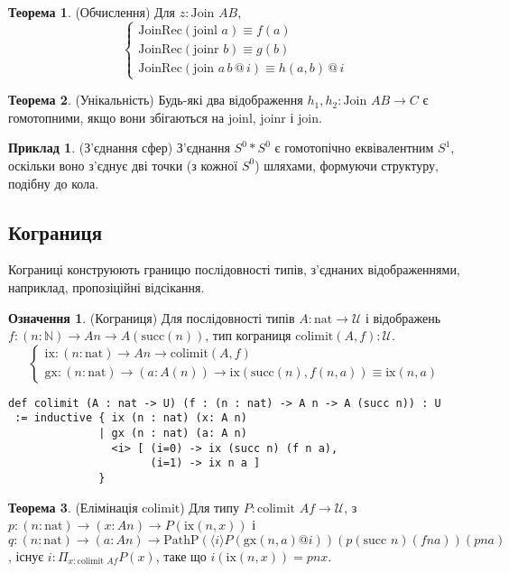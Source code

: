 \documentclass{article}
\theoremstyle{definition}
\newtheorem{theorem}{Теорема}
\newtheorem{definition}{Означення}
\newtheorem{example}{Приклад}
\begin{document}
\begin{theorem} (Обчислення)
Для \( z : \text{Join } A B \),
\[
\begin{cases}
\text{JoinRec}(\text{joinl } a) \equiv f(a) \\
\text{JoinRec}(\text{joinr } b) \equiv g(b) \\
\text{JoinRec}(\text{join } a \, b \, @ \, i) \equiv h(a, b) \, @ \, i
\end{cases}
\]
\end{theorem}

\begin{theorem} (Унікальність)
Будь-які два відображення \( h_1, h_2 : \text{Join } A B \to C \) є гомотопними,
якщо вони збігаються на \( \text{joinl} \), \( \text{joinr} \) і \( \text{join} \).
\end{theorem}

\begin{example} (З’єднання сфер)
З’єднання \( S^0 * S^0 \) є гомотопічно еквівалентним \( S^1 \), оскільки воно з’єднує
дві точки (з кожної \( S^0 \)) шляхами, формуючи структуру, подібну до кола.
\end{example}

\subsection{Кограниця}
Кограниці конструюють границю послідовності типів, з’єднаних відображеннями,
наприклад, пропозіційні відсікання.

\begin{definition} (Кограниця)
Для послідовності типів \( A : \text{nat} \to \mathcal{U} \) і
відображень \( f : (n : \mathbb{N}) \to A n \to A(\text{succ}(n)) \),
тип кограниця \( \text{colimit}(A,f) : \mathcal{U} \).
\[
\begin{cases}
\text{ix} : (n : \text{nat}) \to A n \to \text{colimit}(A,f) \\
\text{gx} : (n : \text{nat}) \to (a : A(n)) \to \text{ix} (\text{succ}(n),f(n,a)) \equiv \text{ix}(n,a)
\end{cases}
\]
\begin{lstlisting}
def colimit (A : nat -> U) (f : (n : nat) -> A n -> A (succ n)) : U
 := inductive { ix (n : nat) (x: A n)
              | gx (n : nat) (a: A n)
                <i> [ (i=0) -> ix (succ n) (f n a),
                      (i=1) -> ix n a ]
              }
\end{lstlisting}
\end{definition}

\begin{theorem} (Елімінація \( \text{colimit} \))
Для типу \( P : \text{colimit } A f \to \mathcal{U} \),
з \( p : (n : \text{nat}) \to (x : A n) \to P(\text{ix}(n, x)) \)
і \( q : (n : \text{nat}) \to (a : A n) \to \text{PathP} (\langle i \rangle P(\text{gx}(n, a) @ i)) (p (\text{succ } n) (f n a)) (p n a) \),
існує \( i : \Pi_{x:\text{colimit } A f} P(x) \), таке що \( i(\text{ix}(n, x)) = p n x \).
\end{theorem}
\end{document}
